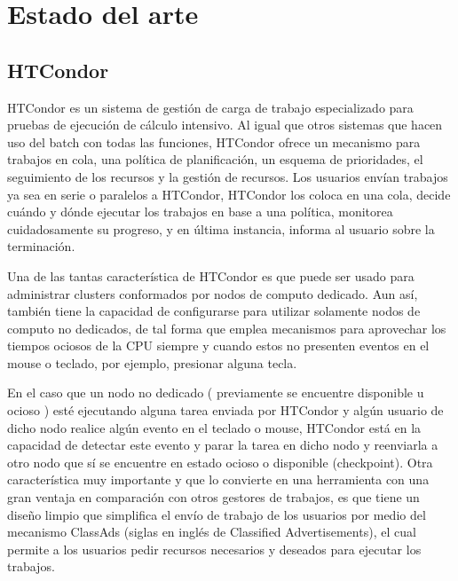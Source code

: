 

\chapter{Estado del arte} %

\label{Chapter3} %

\section{HTCondor}
HTCondor es un sistema de gestión de carga de trabajo especializado para pruebas de ejecución de cálculo intensivo. Al igual que otros sistemas que hacen uso del batch con todas las funciones, HTCondor ofrece un mecanismo para trabajos en cola,  una política de planificación, un esquema de prioridades, el seguimiento de los recursos y la gestión de recursos. Los usuarios envían trabajos ya sea en serie o paralelos a HTCondor, HTCondor los coloca en una cola, decide cuándo y dónde ejecutar los trabajos en base a una política, monitorea cuidadosamente su progreso, y en última instancia, informa al usuario sobre la terminación.

Una de las tantas característica de HTCondor es que puede ser usado para administrar clusters conformados por nodos de computo dedicado. Aun así, también tiene la capacidad de configurarse para utilizar solamente nodos de computo no dedicados, de tal forma que emplea mecanismos para aprovechar los tiempos ociosos de la CPU siempre y cuando estos no presenten eventos en el mouse o teclado, por ejemplo, presionar alguna tecla. 

En el caso que un nodo no dedicado ( previamente se encuentre disponible u ocioso ) esté ejecutando alguna tarea enviada por HTCondor y algún usuario de dicho nodo realice algún evento en el teclado o mouse, HTCondor está en la capacidad de detectar este evento y parar la tarea en dicho nodo y reenviarla a otro nodo que sí se encuentre en estado ocioso o disponible (checkpoint). Otra característica muy importante y que lo convierte en una herramienta con una gran ventaja en comparación con otros gestores de trabajos, es que tiene un diseño limpio que simplifica el envío de trabajo de los usuarios por medio del mecanismo ClassAds (siglas en inglés de Classified Advertisements), el cual permite a los usuarios pedir recursos necesarios y deseados para ejecutar los trabajos.

